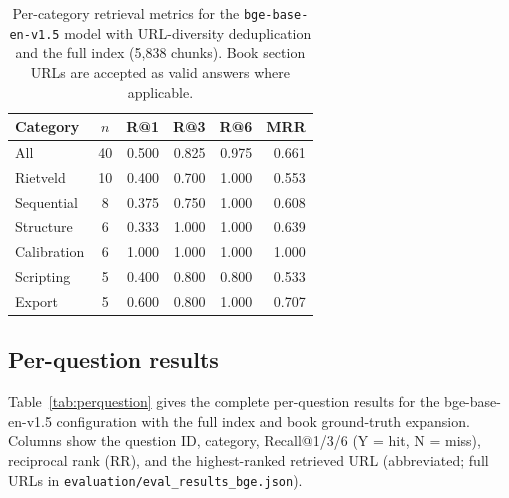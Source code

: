 \documentclass[12pt,a4paper]{article}
\begin{document}
\begin{table}[htbp]
  \centering
  \caption{Per-category retrieval metrics for the \texttt{bge-base-en-v1.5}
           model with URL-diversity deduplication and the full index
           (5{,}838 chunks).
           Book section URLs are accepted as valid answers where applicable.}
  \label{tab:percategory}
  \begin{tabular}{lcrrrr}
    \toprule
    Category & $n$ & R@1 & R@3 & R@6 & MRR \\
    \midrule
    All         & 40 & 0.500 & 0.825 & 0.975 & 0.661 \\
    \midrule
    Rietveld    & 10 & 0.400 & 0.700 & 1.000 & 0.553 \\
    Sequential  & 8  & 0.375 & 0.750 & 1.000 & 0.608 \\
    Structure   & 6  & 0.333 & 1.000 & 1.000 & 0.639 \\
    Calibration & 6  & 1.000 & 1.000 & 1.000 & 1.000 \\
    Scripting   & 5  & 0.400 & 0.800 & 0.800 & 0.533 \\
    Export      & 5  & 0.600 & 0.800 & 1.000 & 0.707 \\
    \bottomrule
  \end{tabular}
\end{table}

\subsection{Per-question results}
\label{sec:perquestion}

Table~\ref{tab:perquestion} gives the complete per-question results for the
bge-base-en-v1.5 configuration with the full index and book ground-truth
expansion.
Columns show the question ID, category, Recall@1/3/6 (Y = hit, N = miss),
reciprocal rank (RR), and the highest-ranked retrieved URL
(abbreviated; full URLs in \texttt{evaluation/eval\_results\_bge.json}).
\end{document}
